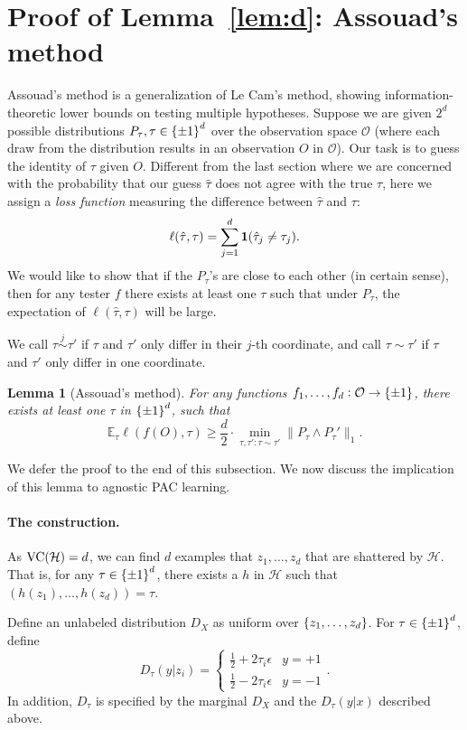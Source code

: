 \documentclass{article}
\newtheorem{lemma}{Lemma}
\DeclareMathOperator*{\VC}{{\rm VC}}
\newcommand{\EE}{\mathbb{E}}
\newcommand{\Hcal}{\mathcal{H}}
\newcommand{\Ocal}{\mathcal{O}}
\newcommand*{\one}{{\bf 1}}
\begin{document}
\section{Proof of Lemma~\ref{lem:d}: Assouad's method}
Assouad's method is a generalization of Le Cam's method, showing
information-theoretic lower bounds on testing multiple hypotheses.
Suppose we are given $2^d$ possible distributions $P_\tau, \tau \in \cbr{\pm 1}^d$
over the observation space $\Ocal$ (where each draw from the distribution results in an observation $O$ in $\Ocal$).
Our task is to guess the identity of $\tau$ given $O$. Different from
the last section where we are concerned with the probability that our
guess $\hat{\tau}$ does not agree with the true $\tau$, here we assign a
{\em loss function} measuring the difference between $\hat{\tau}$ and $\tau$:
\[ \ell(\hat{\tau}, \tau) = \sum_{j=1}^d \one(\hat{\tau}_j \neq \tau_j). \]
We would like to show that if the $P_\tau$'s are close to each other (in certain sense),
then for any tester $f$ there exists at least one $\tau$ such that under $P_\tau$,
the expectation of $\ell(\hat{\tau}, \tau)$ will be large.

We call $\tau\stackrel{j}{\sim}\tau'$ if $\tau$ and $\tau'$ only differ
in their $j$-th coordinate, and call $\tau \sim \tau'$ if $\tau$ and $\tau'$
only differ in one coordinate.

\begin{lemma}[Assouad's method]
For any functions $f_1, \ldots, f_d: \Ocal \to \cbr{\pm 1}$, there exists at least one
$\tau$ in $\cbr{\pm 1}^d$, such that
\[ \EE_{\tau} \ell(f(O), \tau) \geq \frac{d}{2} \cdot \min_{\tau, \tau': \tau \sim \tau'} \| P_\tau \wedge P_\tau' \|_1.  \]
\label{lem:assouad}
\end{lemma}

We defer the proof to the end of this subsection. We now discuss the implication of this lemma to agnostic PAC learning.

\paragraph{The construction.} As $\VC(\Hcal) = d$, we can find $d$ examples
 that $z_1,\ldots,z_d$ that are shattered by $\Hcal$. That is, for any $\tau \in \cbr{\pm 1}^d$, there exists a $h$ in $\Hcal$ such that $(h(z_1), \ldots, h(z_d)) = \tau$.

Define an unlabeled distribution $D_X$ as uniform over $\cbr{z_1,\ldots,z_d}$. For $\tau \in \cbr{\pm 1}^d$, define
\[ D_\tau(y|z_i) = \begin{cases} \frac12 + 2 \tau_i \epsilon & y = +1 \\ \frac12 - 2 \tau_i \epsilon & y = -1 \end{cases}. \]
In addition, $D_\tau$ is specified by the marginal $D_X$ and the $D_\tau(y|x)$ described above.
\end{document}
